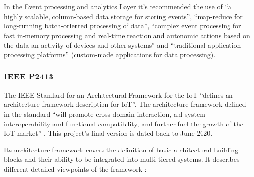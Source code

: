 In the Event processing and analytics Layer it's recommended the use of ``a highly scalable, column-based data storage for storing events'', ``map-reduce for long-running batch-oriented processing of data'', ``complex event processing for fast in-memory processing and real-time reaction and autonomic actions based on the data an activity of devices and other systems'' and ``traditional application processing platforms'' (custom-made applications for data processing).

\subsubsection{IEEE P2413}
\label{subsubsec:stateofart:arch:p2413}

The IEEE Standard for an Architectural Framework for the IoT ``defines an architecture framework description for \gls{IoT}''. The architecture framework defined in the standard ``will promote cross-domain interaction, aid system
interoperability and functional compatibility, and further fuel the growth of the IoT market'' \parencite{9032420}.  This project's final version is dated back to June 2020.

Its architecture framework covers the definition of basic architectural building blocks and their ability to be integrated into multi-tiered systems. It describes different detailed viewpoints of the framework \parencite{9032420}:

